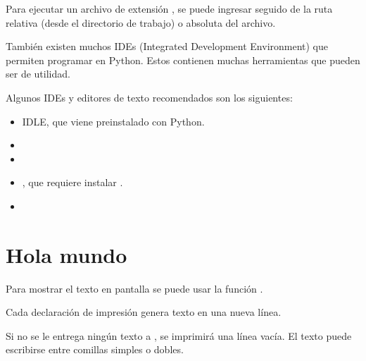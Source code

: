 
Para ejecutar un archivo de extensión , se puede ingresar  seguido de la ruta relativa (desde el directorio de trabajo) o absoluta del archivo.


También existen muchos IDEs (Integrated Development Environment) que permiten programar en Python. Estos contienen muchas herramientas que pueden ser de utilidad.\smallskip

Algunos IDEs y editores de texto recomendados son los siguientes:

\begin{itemize}
  \item IDLE, que viene preinstalado con Python.
    
  \item {}
  
  \item {}

  \item {}, que requiere instalar .
  
  \item {}
  
\end{itemize}

\section{Hola mundo}

Para mostrar el texto  en pantalla se puede usar la función .


Cada declaración de impresión  genera texto en una nueva línea.


Si no se le entrega ningún texto a , se imprimirá una línea vacía. El texto puede escribirse entre comillas simples o dobles.


